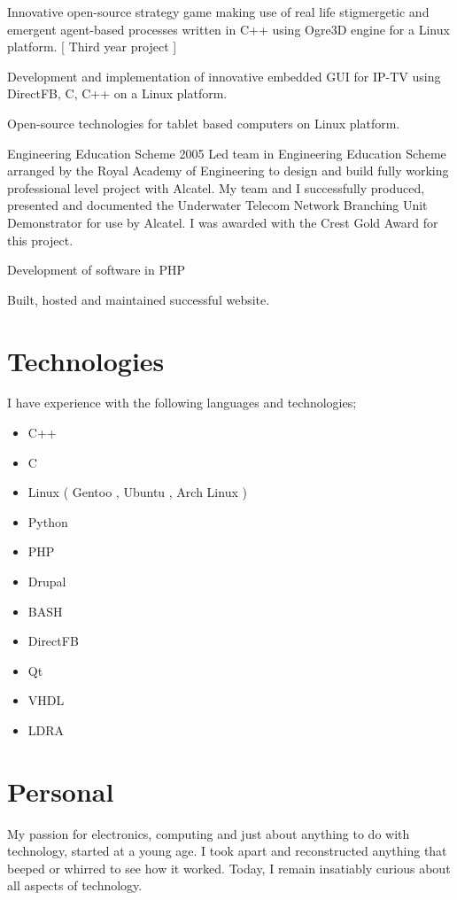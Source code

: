 \documentclass[overlapped,line,letterpaper]{res}
\begin{document}
\begin{resume}
{
    Innovative open-source strategy game making use of real life stigmergetic
    and emergent agent-based processes written in C++ using Ogre3D engine for a
    Linux platform. [ Third year project ]
}

{
    Development and implementation of innovative embedded GUI for IP-TV using
    DirectFB, C, C++ on a Linux platform.
}

{
    Open-source technologies for tablet based computers on Linux platform.
}

  {Engineering Education Scheme}
  {2005}
{
    Led team in Engineering Education Scheme arranged by the Royal Academy of
    Engineering to design and build fully working professional level project
    with Alcatel.
    My team and I successfully produced, presented and documented the Underwater
    Telecom Network Branching Unit Demonstrator for use by Alcatel.
    I was awarded with the Crest Gold Award for this project.
}

{
    Development of software in PHP
}

{
    Built, hosted and maintained successful website.
}

\section{\bf{Technologies} }
I have experience with the following languages and technologies;
\begin{itemize}
 \item C++
 \item C
 \item Linux ( Gentoo , Ubuntu , Arch Linux )
 \item Python
 \item PHP
 \item Drupal
 \item BASH
 \item DirectFB
 \item Qt
 \item VHDL
 \item LDRA
\end{itemize}

\newpage

\section{\bf{ Personal } }
My passion for electronics, computing and just about anything to do with
technology, started at a young age.
I took apart and reconstructed anything that beeped or whirred to see how it
worked.
Today, I remain insatiably curious about all aspects of technology.


\end{resume}
\end{document}
